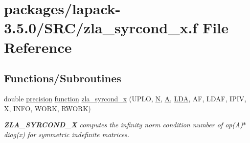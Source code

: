 \hypertarget{zla__syrcond__x_8f}{}\section{packages/lapack-\/3.5.0/\+S\+R\+C/zla\+\_\+syrcond\+\_\+x.f File Reference}
\label{zla__syrcond__x_8f}
\subsection*{Functions/\+Subroutines}
\begin{DoxyCompactItemize}
\item 
double \hyperlink{numinquire_8h_a2c8e616467665d0b2814d4c1589ba74e}{precision} \hyperlink{afunc_8m_a7b5e596df91eadea6c537c0825e894a7}{function} \hyperlink{group__complex16SYcomputational_ga8f1255b5910222ae69288e5e7ae9455d}{zla\+\_\+syrcond\+\_\+x} (U\+P\+L\+O, \hyperlink{polmisc_8c_a0240ac851181b84ac374872dc5434ee4}{N}, \hyperlink{classA}{A}, \hyperlink{example__user_8c_ae946da542ce0db94dced19b2ecefd1aa}{L\+D\+A}, A\+F, L\+D\+A\+F, I\+P\+I\+V, X, I\+N\+F\+O, W\+O\+R\+K, R\+W\+O\+R\+K)
\begin{DoxyCompactList}\small\item\em {\bfseries Z\+L\+A\+\_\+\+S\+Y\+R\+C\+O\+N\+D\+\_\+\+X} computes the infinity norm condition number of op(\+A)$\ast$diag(x) for symmetric indefinite matrices. \end{DoxyCompactList}\end{DoxyCompactItemize}
